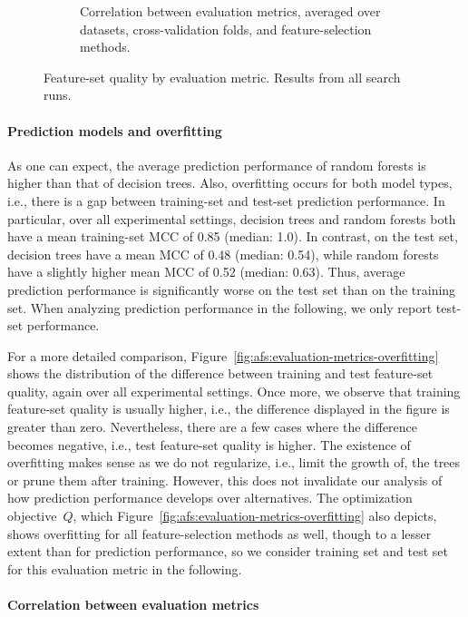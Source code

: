 \documentclass{article}
\theoremstyle{definition}
\begin{document}
\begin{figure}[htb]
\begin{subfigure}[t]{0.48\textwidth}
		\caption{Correlation between evaluation metrics, averaged over datasets, cross-valida\-tion folds, and feature-selection methods.}
		\label{fig:afs:evaluation-metrics-correlation}
	\end{subfigure}
	\caption{
		Feature-set quality by evaluation metric.
		Results from all search runs.
	}
	\label{fig:afs:evaluation-metrics}
\end{figure}

\paragraph{Prediction models and overfitting}

As one can expect, the average prediction performance of random forests is higher than that of decision trees.
Also, overfitting occurs for both model types, i.e., there is a gap between training-set and test-set prediction performance.
In particular, over all experimental settings, decision trees and random forests both have a mean training-set MCC of 0.85 (median: 1.0).
In contrast, on the test set, decision trees have a mean MCC of 0.48 (median: 0.54), while random forests have a slightly higher mean MCC of 0.52 (median: 0.63).
Thus, average prediction performance is significantly worse on the test set than on the training set.
When analyzing prediction performance in the following, we only report test-set performance.

For a more detailed comparison, Figure~\ref{fig:afs:evaluation-metrics-overfitting} shows the distribution of the difference between training and test feature-set quality, again over all experimental settings.
Once more, we observe that training feature-set quality is usually higher, i.e., the difference displayed in the figure is greater than zero.
Nevertheless, there are a few cases where the difference becomes negative, i.e., test feature-set quality is higher.
The existence of overfitting makes sense as we do not regularize, i.e., limit the growth of, the trees or prune them after training.
However, this does not invalidate our analysis of how prediction performance develops over alternatives.
The optimization objective~$Q$, which Figure~\ref{fig:afs:evaluation-metrics-overfitting} also depicts, shows overfitting for all feature-selection methods as well, though to a lesser extent than for prediction performance, so we consider training set and test set for this evaluation metric in the following.

\paragraph{Correlation between evaluation metrics}
\end{document}
